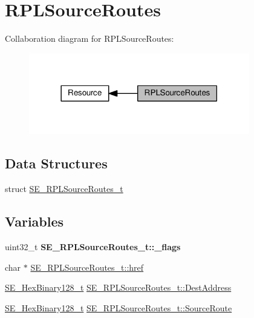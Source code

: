 \hypertarget{group__RPLSourceRoutes}{}\section{R\+P\+L\+Source\+Routes}
\label{group__RPLSourceRoutes}
Collaboration diagram for R\+P\+L\+Source\+Routes\+:\nopagebreak
\begin{figure}[H]
\begin{center}
\leavevmode
\includegraphics[width=273pt]{group__RPLSourceRoutes}
\end{center}
\end{figure}
\subsection*{Data Structures}
\begin{DoxyCompactItemize}
\item 
struct \hyperlink{structSE__RPLSourceRoutes__t}{S\+E\+\_\+\+R\+P\+L\+Source\+Routes\+\_\+t}
\end{DoxyCompactItemize}
\subsection*{Variables}
\begin{DoxyCompactItemize}
\item 
\mbox{\label{group__RPLSourceRoutes_ga16dd83976be6ffd507949e283a2224be}} 
uint32\+\_\+t {\bfseries S\+E\+\_\+\+R\+P\+L\+Source\+Routes\+\_\+t\+::\+\_\+flags}
\item 
char $\ast$ \hyperlink{group__RPLSourceRoutes_ga0b07b3df2479ac16c793f7bda884e20b}{S\+E\+\_\+\+R\+P\+L\+Source\+Routes\+\_\+t\+::href}
\item 
\hyperlink{group__HexBinary128_gae3e6f0afe8ab371017bc37a0831926c5}{S\+E\+\_\+\+Hex\+Binary128\+\_\+t} \hyperlink{group__RPLSourceRoutes_ga740dc3113e13f6f53966619f9ddef8ab}{S\+E\+\_\+\+R\+P\+L\+Source\+Routes\+\_\+t\+::\+Dest\+Address}
\item 
\hyperlink{group__HexBinary128_gae3e6f0afe8ab371017bc37a0831926c5}{S\+E\+\_\+\+Hex\+Binary128\+\_\+t} \hyperlink{group__RPLSourceRoutes_ga3443600c5c98ba4bce27431a98a7b6ae}{S\+E\+\_\+\+R\+P\+L\+Source\+Routes\+\_\+t\+::\+Source\+Route}
\end{DoxyCompactItemize}


